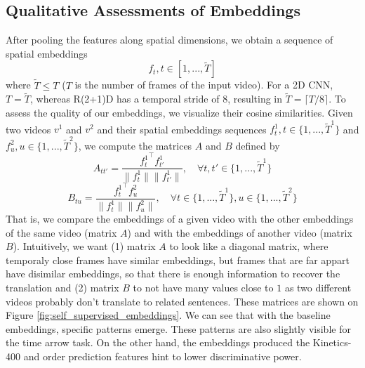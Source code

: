 \documentclass[final]{cvpr}
\begin{document}
\subsection{Qualitative Assessments of Embeddings}
After pooling the features along spatial dimensions, we obtain a sequence of spatial embeddings
$$f_t, t\in[1, ..., \tilde{T}]$$
where $\tilde{T}\leq T$ ($T$ is the number of frames of the input video). For a 2D CNN, $T=\tilde{T}$, whereas R(2+1)D has a temporal stride of $8$, resulting in $\tilde{T} = \lceil T/8 \rceil$.
To assess the quality of our embeddings, we visualize their cosine similarities. Given two videos $v^1$ and $v^2$ and their spatial embeddings sequences $f_t^1, t\in\{1, ..., \tilde{T}^1\}$ and $f_u^2, u\in \{1, ...,  \tilde{T}^2\}$, we compute the matrices $A$ and $B$ defined by
$$A_{tt'} = \frac{{f_t^1}^\intercal f_{t'}^1}{\lVert f_t^1 \rVert \lVert f_{t'}^1 \rVert}, \quad\forall t, t' \in\{1, ..., \tilde{T}^1\}$$
$$B_{tu} = \frac{{f_t^1}^\intercal f_u^2}{\lVert f_t^1 \rVert \lVert f_u^2 \rVert}, \quad \forall t \in\{1, ..., \tilde{T}^1\}, u \in\{1, ..., \tilde{T}^2\}$$
That is, we compare the embeddings of a given video with the other embeddings of the same video (matrix $A$) and with the embeddings of another video (matrix $B$). Intuitively, we want 
(1) matrix $A$ to look like a diagonal matrix, where temporaly close frames have similar embeddings, but frames that are far appart have disimilar embeddings, so that there is enough information to recover the translation and (2) matrix $B$ to not have many values close to $1$ as two different videos probably don't translate to related sentences. These matrices are shown on Figure \ref{fig:self_supervised_embeddings}. We can see that with the baseline embeddings, specific patterns emerge. These patterns are also slightly visible for the time arrow task. On the other hand, the embeddings produced the Kinetics-400 and order prediction features hint to lower discriminative power.
\end{document}
